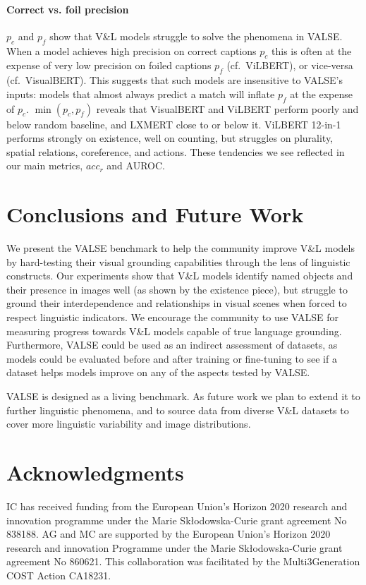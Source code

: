 \documentclass[11pt]{article}
\newcommand{\dataset}{VALSE}
\begin{document}
\paragraph{Correct vs. foil precision}
$p_c$ and $p_f$ show that V\&L models struggle to solve the phenomena in \dataset{}.
When a model achieves high precision on  correct captions $p_c$ this is often at the expense of very low precision on foiled captions $p_f$ 
(cf.\ ViLBERT), or vice-versa (cf.\ VisualBERT).
This suggests that such models are insensitive to \dataset{}'s inputs:
models that almost always predict a match will inflate $p_f$ at the expense of $p_c$.
$\min(p_c, p_f)$ reveals that
VisualBERT and ViLBERT perform poorly and below random baseline, and LXMERT 
close to or below it.
ViLBERT 12-in-1 performs strongly on existence, well on counting, but struggles on plurality, spatial relations, coreference, and actions. These tendencies we see reflected in our main metrics, $acc_r$ and AUROC.



\section{Conclusions and Future Work}\label{sec:conclusion}
We present the \dataset{} benchmark to help the community improve V\&L models by hard-testing their visual grounding capabilities through the lens of linguistic constructs.
Our experiments show that V\&L models identify named objects and their presence in images well (as shown by the existence piece), but struggle to ground 
their interdependence and relationships in visual scenes when forced to respect linguistic indicators.
We encourage the community to use \dataset{} for measuring progress towards V\&L models capable of true language grounding.
Furthermore, \dataset{} could be used as an indirect assessment of datasets, as models could be evaluated before and after training or fine-tuning to see if a dataset helps models improve on any of the aspects tested by \dataset{}.

\dataset{} is designed as a living benchmark. As future work we plan to extend it to further linguistic phenomena, and to source data from diverse V\&L datasets to cover more linguistic variability and image distributions.

\section*{Acknowledgments}
IC has received funding from the European Union’s Horizon 2020 research and innovation programme under the Marie Sk\l{}odowska-Curie grant agreement No 838188. 
AG and MC are supported by the European Union's Horizon 2020 research and innovation Programme under the Marie Sk\l{}odowska-Curie grant agreement No 860621. 
This collaboration was facilitated by the Multi3Generation COST Action CA18231.
\end{document}
